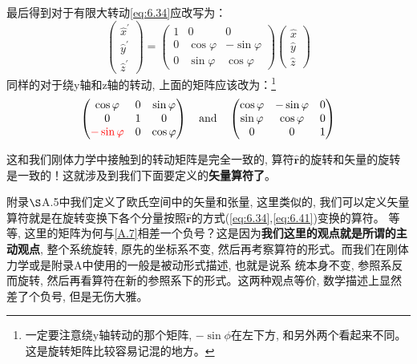 最后得到对于有限大转动\ref{eq:6.34}应改写为：
\begin{equation}
    \left(\begin{array}{l}
        \hat{x}^{\prime} \\
        \hat{y}^{\prime} \\
        \hat{z}^{\prime}
        \end{array}\right)=\left(\begin{array}{ccc}
        1 & 0 & 0 \\
        0 & \cos\varphi & -\sin\varphi \\
        0 & \sin\varphi & \cos\varphi
        \end{array}\right)\left(\begin{array}{l}
        \hat{x} \\ 
        \hat{y} \\
        \hat{z}
        \end{array}\right)
\end{equation}
同样的对于绕y轴和z轴的转动, 上面的矩阵应该改为：\footnote{一定要注意绕y轴转动的那个矩阵, $-\sin\phi$在左下方, 和另外两个看起来不同。这是旋转矩阵比较容易记混的地方。}
\begin{equation}
    \label{eq:6.41}
    \begin{pmatrix}
        \cos\varphi & 0 & \sin\varphi \\
        0 & 1& 0 \\
        {\color{red}-\sin\varphi}& 0  & \cos\varphi
    \end{pmatrix}\quad\text{and}\quad
    \begin{pmatrix}
        \cos\varphi & -\sin\varphi& 0  \\
        \sin\varphi&  \cos\varphi  &0\\
        0 & 0& 1
    \end{pmatrix}
\end{equation}

这和我们刚体力学中接触到的转动矩阵是完全一致的, 算符$\hat{\mathbf{r}}$的旋转和矢量的旋转是一致的！这就涉及到我们下面要定义的\textbf{矢量算符了}。

附录$\S $A.5中我们定义了欧氏空间中的矢量和张量, 这里类似的, 我们可以定义矢量算符就是在旋转变换下各个分量按照$\hat{\mathbf{r}}$的方式(\ref{eq:6.34},\ref{eq:6.41})变换的算符。
等等, 这里的矩阵为何与\ref{A.7}相差一个负号？这是因为\textbf{我们这里的观点就是所谓的主动观点}, 整个系统旋转, 原先的坐标系不变, 然后再考察算符的形式。而我们在刚体力学或是附录A中使用的一般是被动形式描述, 也就是说系
统本身不变, 参照系反而旋转, 然后再看算符在新的参照系下的形式。这两种观点等价, 数学描述上显然差了个负号, 但是无伤大雅。

